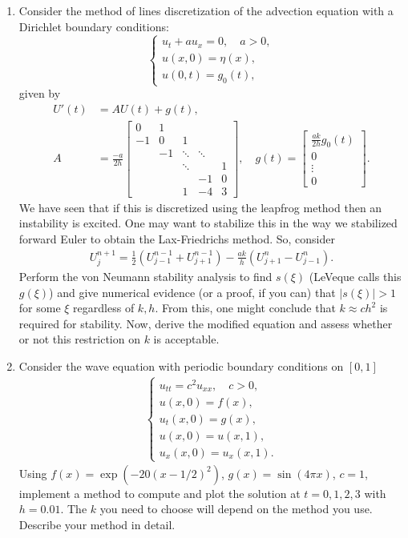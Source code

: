 \documentclass[10pt]{amsart}
\begin{document}
\begin{enumerate}[label={\bf Problem~{\arabic*}:}]
  \mline
\item Consider the method of lines discretization of the advection equation with a Dirichlet boundary conditions:
  $$ \begin{cases} u_t + a u_{x} = 0, \quad a > 0,\\
u(x,0) = \eta(x),\\
u(0,t) = g_0(t), \end{cases} $$
given by
\begin{align*}
  U'(t) &= A U(t) + g(t),\\
  A &= \frac{-a}{2h} \begin{bmatrix} 0 & 1 \\
    -1 & 0 & 1 \\
    & -1 & \ddots & \ddots \\
    && \ddots && 1\\
    &&& -1 & 0 \\
    &&1 & -4 & 3
  \end{bmatrix}, \quad g(t) = \begin{bmatrix} \frac{ak}{2h} g_0(t) \\ 0 \\ \vdots \\ 0 \end{bmatrix}.
\end{align*}
We have seen that if this is discretized using the leapfrog method then an instability is excited.  One may want to stabilize this in the way we stabilized forward Euler to obtain the Lax-Friedrichs method.  So, consider
\begin{align*}
  U_j^{n+1} = \frac 1 2 ( U_{j-1}^{n-1} + U_{j+1}^{n-1}) - \frac{ak}{h} ( U_{j+1}^n - U_{j-1}^n).
\end{align*}
Perform the von Neumann stability analysis to find $s(\xi)$ (LeVeque calls this $g(\xi)$) and give numerical evidence (or a proof, if you can) that $|s(\xi)| > 1$ for some $\xi$ regardless of $k,h$.  From this, one might conclude that $k \approx c h^2$ is required for stability.  Now, derive the modified equation and assess whether or not this restriction on $k$ is acceptable.

\mline
\item Consider the wave equation with periodic boundary conditions on $[0,1]$
  \begin{align*}
    \begin{cases}
      u_{tt} = c^2 u_{xx}, \quad c > 0,\\
      u(x,0) = f(x),\\
      u_t(x,0) = g(x),\\
      u(x,0) = u(x,1),\\
      u_x(x,0) = u_x(x,1).
    \end{cases}
  \end{align*}
  Using $f(x) = \exp( -20(x-1/2)^2 )$, $g(x) = \sin(4\pi x)$, $c = 1$, implement a method to compute and plot the solution at $t = 0,1,2,3$ with $h = 0.01$.  The $k$ you need to choose will depend on the method you use.  Describe your method in detail.


\end{enumerate}
\end{document}
